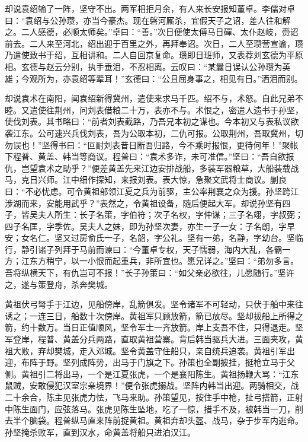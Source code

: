 却说袁绍输了一阵，坚守不出。两军相拒月余，有人来长安报知董卓。李儒对卓曰：“袁绍与公孙瓒，亦当今豪杰。现在磐河厮杀，宜假天子之诏，差人往和解之。二人感德，必顺太师矣。”卓曰：“善。”次日便使太傅马日磾、太仆赵岐，赍诏前去。二人来至河北，绍出迎于百里之外，再拜奉诏。次日，二人至瓒营宣谕，瓒乃遣使致书于绍，互相讲和。二人自回京复命。瓒即日班师，又表荐刘玄德为平原相。玄德与赵云分别，执手垂泪，不忍相离。云叹曰：“某曩日误认公孙瓒为英雄；今观所为，亦袁绍等辈耳！”玄德曰：“公且屈身事之，相见有日。”洒泪而别。

却说袁术在南阳，闻袁绍新得冀州，遣使来求马千匹。绍不与，术怒。自此兄弟不睦。又遣使往荆州，问刘表借粮二十万，表亦不与。术恨之，密遣人遗书于孙坚，使伐刘表。其书略曰：“前者刘表截路，乃吾兄本初之谋也。今本初又与表私议欲袭江东。公可速兴兵伐刘表，吾为公取本初，二仇可报。公取荆州，吾取冀州，切勿误也！”坚得书曰：“叵耐刘表昔日断吾归路，今不乘时报恨，更待何年！”聚帐下程普、黄盖、韩当等商议。程普曰：“袁术多诈，未可准信。”坚曰：“吾自欲报仇，岂望袁术之助乎？”便差黄盖先来江边安排战船，多装军器粮草，大船装载战马，克日兴师。江中细作探知，来报刘表。表大惊，急聚文武将士商议。蒯良曰：“不必忧虑。可令黄祖部领江夏之兵为前驱，主公率荆襄之众为援。孙坚跨江涉湖而来，安能用武乎？”表然之，令黄祖设备，随后便起大军。却说孙坚有四子，皆吴夫人所生：长子名策，字伯符；次子名权，字仲谋；三子名翊，字叔弼；四子名匡，字季佐。吴夫人之妹，即为孙坚次妻，亦生一子一女：子名朗，字早安；女名仁。坚又过房俞氏一子，名韶，字公礼。坚有一弟，名静，字幼台。坚临行，静引诸子列拜于马前而谏曰：“今董卓专权，天子懦弱，海内大乱，各霸一方；江东方稍宁，以一小恨而起重兵，非所宜也。愿兄详之。”坚曰：“弟勿多言。吾将纵横天下，有仇岂可不报！”长子孙策曰：“如父亲必欲往，儿愿随行。”坚许之，遂与策登舟，杀奔樊城。

黄祖伏弓弩手于江边，见船傍岸，乱箭俱发。坚令诸军不可轻动，只伏于船中来往诱之；一连三日，船数十次傍岸。黄祖军只顾放箭，箭已放尽。坚却拔船上所得之箭，约十数万。当日正值顺风，坚令军士一齐放箭。岸上支吾不住，只得退走。坚军登岸，程普、黄盖分兵两路，直取黄祖营寨。背后韩当驱兵大进。三面夹攻，黄祖大败，弃却樊城，走入邓城。坚令黄盖守住船只，亲自统兵追袭。黄祖引军出迎，布阵于野。坚列成阵势，出马于门旗之下。孙策也全副披挂，挺枪立马于父侧。黄祖引二将出马，一个是江夏张虎，一个是襄阳陈生。黄祖扬鞭大骂：“江东鼠贼，安敢侵犯汉室宗亲境界！”便令张虎搦战。坚阵内韩当出迎。两骑相交，战二十余合，陈主见张虎力怯，飞马来助。孙策望见，按住手中枪，扯弓搭箭，正射中陈生面门，应弦落马。张虎见陈生坠地，吃了一惊，措手不及，被韩当一刀，削去半个脑袋。程普纵马直来阵前捉黄祖。黄祖弃却头盔、战马，杂于步军内逃命。孙坚掩杀败军，直到汉水，命黄盖将船只进泊汉江。

